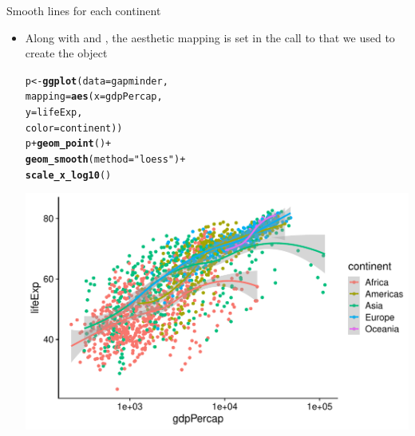 \documentclass[10pt]{beamer}\usepackage[]{graphicx}\usepackage[]{color}
\makeatletter
\def\maxwidth{ %
  \ifdim\Gin@nat@width>\linewidth
    \linewidth
  \else
    \Gin@nat@width
  \fi
}
\newcommand{\hlstr}[1]{\textcolor[rgb]{0.192,0.494,0.8}{#1}}%
\newcommand{\hlopt}[1]{\textcolor[rgb]{0,0,0}{#1}}%
\newcommand{\hlstd}[1]{\textcolor[rgb]{0.345,0.345,0.345}{#1}}%
\newcommand{\hlkwb}[1]{\textcolor[rgb]{0.69,0.353,0.396}{#1}}%
\newcommand{\hlkwc}[1]{\textcolor[rgb]{0.333,0.667,0.333}{#1}}%
\newcommand{\hlkwd}[1]{\textcolor[rgb]{0.737,0.353,0.396}{\textbf{#1}}}%
\newenvironment{kframe}{%
 \def\at@end@of@kframe{}%
 \ifinner\ifhmode%
  \def\at@end@of@kframe{\end{minipage}}%
  \begin{minipage}{\columnwidth}%
 \fi\fi%
 \def\FrameCommand##1{\hskip\@totalleftmargin \hskip-\fboxsep
 \colorbox{shadecolor}{##1}\hskip-\fboxsep
     \hskip-\linewidth \hskip-\@totalleftmargin \hskip\columnwidth}%
 \MakeFramed {\advance\hsize-\width
   \@totalleftmargin\z@ \linewidth\hsize
   \@setminipage}}%
 {\par\unskip\endMakeFramed%
 \at@end@of@kframe}
\newenvironment{knitrout}{}{} %
\makeatother
\begin{document}
\begin{frame}[fragile]{Smooth lines for each continent}
	\begin{itemize}
		\item Along with  and , the  aesthetic mapping is set in the call to  that we used to create the  object
\begin{knitrout}\tiny
{}\color{fgcolor}\begin{kframe}
\begin{alltt}
\hlstd{p} \hlkwb{<-} \hlkwd{ggplot}\hlstd{(}\hlkwc{data} \hlstd{= gapminder,}
            \hlkwc{mapping} \hlstd{=} \hlkwd{aes}\hlstd{(}\hlkwc{x} \hlstd{= gdpPercap,}
            \hlkwc{y} \hlstd{= lifeExp,}
            \hlkwc{color} \hlstd{= continent))}
\hlstd{p} \hlopt{+} \hlkwd{geom_point}\hlstd{()} \hlopt{+}
        \hlkwd{geom_smooth}\hlstd{(}\hlkwc{method} \hlstd{=} \hlstr{"loess"}\hlstd{)} \hlopt{+}
        \hlkwd{scale_x_log10}\hlstd{()}
\end{alltt}
\end{kframe}

{\centering \includegraphics[width=\maxwidth]{figure/unnamed-chunk-16-1} 

}


\end{knitrout}
	\end{itemize}
	
\end{frame}
\end{document}
